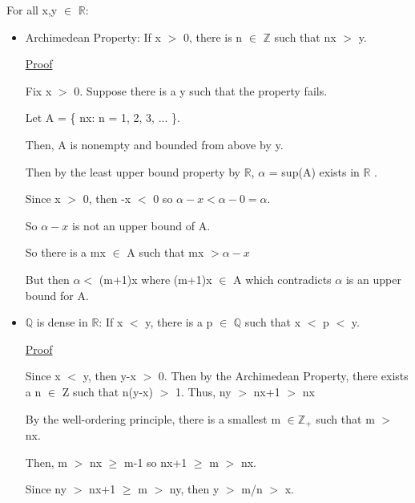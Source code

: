 For all x,y $\in$ $ \mathbb{R} $:
\begin{itemize}[leftmargin=1cm]
	\item {\color{lblue} Archimedean Property}: If x $>$ 0, there is n $\in$ $ \mathbb{Z} $ such that nx $>$ y.
	
		{ \color{magenta} \underline{Proof} }

		Fix x $>$ 0. Suppose there is a y such that the property fails.

		Let A = \{ nx: n = 1, 2, 3, ... \}.

		Then, A is nonempty and bounded from above by y.

		Then by the least upper bound property by $ \mathbb{R} $, $\alpha$ = sup(A) exists in $ \mathbb{R} $ .

		Since x $>$ 0, then -x $<$ 0 so $\alpha - x < \alpha-0 = \alpha$.

		So $\alpha-x$ is not an upper bound of A.

		So there is a mx $\in$ A such that mx $> \alpha-x$

		But then $\alpha <$ (m+1)x where (m+1)x $\in$ A which contradicts $\alpha$ is an upper bound for A.

	\item {\color{lblue} $ \mathbb{Q} $  is dense in $ \mathbb{R} $}:
		If x $<$ y, there is a p $\in$ $ \mathbb{Q} $ such that x $<$ p $<$ y.

		{ \color{magenta} \underline{Proof} }

		Since x $<$ y, then y-x $>$ 0. Then by the Archimedean Property, there exists a n $\in$ Z
		such that n(y-x) $>$ 1. Thus, ny $>$ nx+1 $>$ nx

		By the well-ordering principle, there is a smallest m $\in \mathbb{Z_+} $ such that m $>$ nx.

		Then, m $>$ nx $\geq$ m-1 so nx+1 $\geq$ m $>$ nx.

		Since ny $>$ nx+1 $\geq$ m $>$ ny, then y $>$ m/n $>$ x.

\end{itemize}
